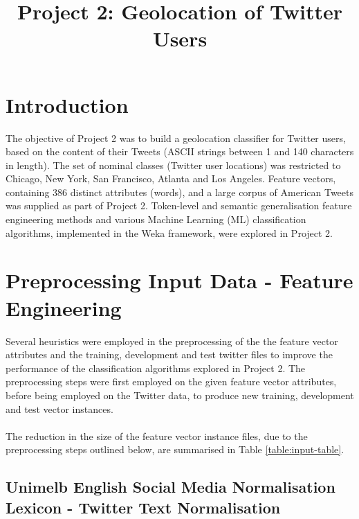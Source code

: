 \documentclass[11pt]{article}
\begin{document}
\title{Project 2: Geolocation of Twitter Users}
\maketitle

\section{Introduction}
The objective of Project 2 was to build a geolocation classifier for Twitter users, based on the content of their Tweets (ASCII strings between 1 and 140 characters in length). The set of nominal classes (Twitter user locations) was restricted to Chicago, New York, San Francisco, Atlanta and Los Angeles. Feature vectors, containing 386 distinct attributes (words), and a large corpus of American Tweets was supplied as part of Project 2. Token-level and semantic generalisation feature engineering methods and various Machine Learning (ML) classification algorithms, implemented in the Weka framework, were explored in Project 2.

\section{Preprocessing Input Data - Feature Engineering}  
\label{section:preproc}

Several heuristics were employed in the preprocessing of the the feature vector attributes and the training, development and test twitter files to improve the performance of the classification algorithms explored in Project 2. The preprocessing steps were first employed on the given feature vector attributes, before being employed on the Twitter data, to produce new training, development and test vector instances.\\\\
The reduction in the size of the feature vector instance files, due to the preprocessing steps outlined below, are summarised in Table \ref{table:input-table}.

\subsection{Unimelb English Social Media Normalisation Lexicon - Twitter Text Normalisation}
\label{subsec:normal}
\end{document}
